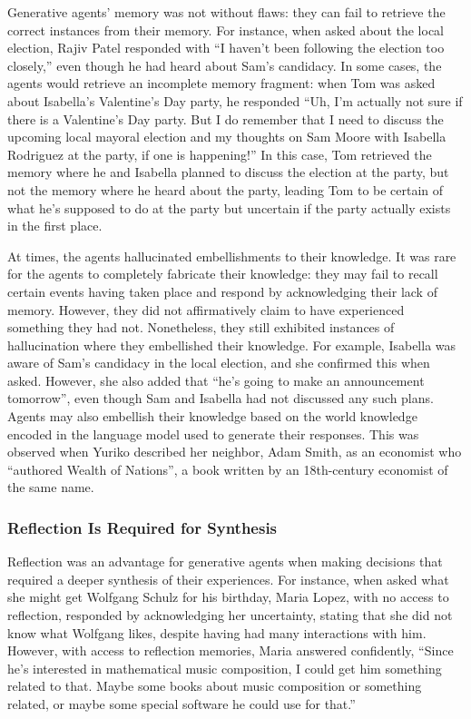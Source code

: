 Generative agents' memory was not without flaws: they can fail to retrieve the correct instances from their memory. For instance, when asked about the local election, Rajiv Patel responded with {\color{darkgray}\small\fontfamily{}\selectfont
``I haven't been following the election too closely,''} even though he had heard about Sam's candidacy. In some cases, the agents would retrieve an incomplete memory fragment: when Tom was asked about Isabella's Valentine's Day party, he responded {\color{darkgray}\small\fontfamily{}\selectfont
``Uh, I’m actually not sure if there is a Valentine’s Day party. But I do remember that I need to discuss the upcoming local mayoral election and my thoughts on Sam Moore with Isabella Rodriguez at the party, if one is happening!''} In this case, Tom retrieved the memory where he and Isabella planned to discuss the election at the party, but not the memory where he heard about the party, leading Tom to be certain of what he's supposed to do at the party but uncertain if the party actually exists in the first place.

At times, the agents hallucinated embellishments to their knowledge. It was rare for the agents to completely fabricate their knowledge: they may fail to recall certain events having taken place and respond by acknowledging their lack of memory. However, they did not affirmatively claim to have experienced something they had not. Nonetheless, they still exhibited instances of hallucination where they embellished their knowledge. For example, Isabella was aware of Sam's candidacy in the local election, and she confirmed this when asked. However, she also added that {\color{darkgray}\small\fontfamily{}\selectfont
``he's going to make an announcement tomorrow''}, even though Sam and Isabella had not discussed any such plans. Agents may also embellish their knowledge based on the world knowledge encoded in the language model used to generate their responses. This was observed when Yuriko described her neighbor, Adam Smith, as an economist who {\color{darkgray}\small\fontfamily{}\selectfont
``authored Wealth of Nations''}, a book written by an 18th-century economist of the same name.

\subsubsection{Reflection Is Required for Synthesis} Reflection was an advantage for generative agents when making decisions that required a deeper synthesis of their experiences. For instance, when asked what she might get Wolfgang Schulz for his birthday, Maria Lopez, with no access to reflection, responded by acknowledging her uncertainty, stating that she did not know what Wolfgang likes, despite having had many interactions with him. However, with access to reflection memories, Maria answered confidently, {\color{darkgray}\small\fontfamily{}\selectfont
``Since he's interested in mathematical music composition, I could get him something related to that. Maybe some books about music composition or something related, or maybe some special software he could use for that.''} 

